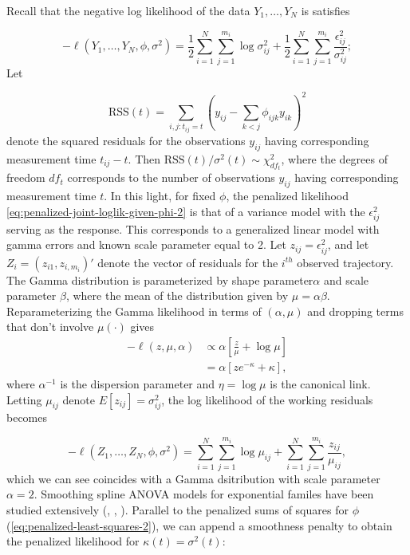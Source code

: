 

Recall that the negative log likelihood of the data $Y_1,\dots, Y_N$ is satisfies

\begin{equation} \label{eq:penalized-joint-loglik-given-phi-2}
-\ell\left( Y_1,\dots, Y_N, \phi, \sigma^2 \right) =  \frac{1}{2}\sum_{i = 1}^N \sum_{j = 1}^{m_i} \log \sigma^2_{ij}  + \frac{1}{2}\sum_{i = 1}^N \sum_{j = 1}^{m_i} \frac {\epsilon_{ij}^2}{\sigma^2_{ij}};
\end{equation}
\noindent
Let 

\begin{equation}
\mbox{RSS}\left( t \right) = \sum_{i,j:t_{ij}= t} \left( y_{ij} - \sum_{k<j} \phi_{ijk} y_{ik}\right)^2
\end{equation}
\noindent
denote the squared residuals for the observations $y_{ij}$ having corresponding measurement time $t_{ij} - t$. Then $\mbox{RSS}\left( t \right)/\sigma^2\left(t\right) \sim \chi^2_{df_t}$, where the degrees of freedom $df_{t}$ corresponds to the number of observations $y_{ij}$ having corresponding measurement time $t$. In this light, for fixed $\phi$, the penalized likelihood \ref{eq:penalized-joint-loglik-given-phi-2} is that of a variance model with the $\epsilon_{ij}^2$ serving as the response.  This corresponds to a generalized linear model with gamma errors and known scale parameter equal to 2. Let $z_{ij} = \epsilon_{ij}^2$, and let $Z_{i} = \left(z_{i1},z_{i,m_i} \right)'$ denote the vector of residuals for the $i^{th}$ observed trajectory. The Gamma distribution is parameterized by shape parameter$\alpha$ and scale parameter $\beta$, where the mean of the distribution given by $\mu = \alpha \beta$. Reparameterizing the Gamma likelihood in terms of $\left(\alpha, \mu \right)$ and dropping terms that don't involve $\mu\left(\cdot\right)$ gives  
\begin{align}
-\ell\left(z,\mu, \alpha \right) &\propto \alpha\left[\frac{z}{\mu} + \log \mu\right]  \label{eq:gamma-iv-likelihood} \\ 
&= \alpha\left[ze^{-\kappa} + \kappa\right],\label{eq:gamma-iv-likelihood-canonical-link}
\end{align}
\noindent
where $\alpha^{-1}$ is the dispersion parameter and $\eta = \log \mu$ is the canonical link. Letting $\mu_{ij}$ denote $E\left[ z_{ij} \right] = \sigma_{ij}^2$, the log likelihood of the working residuals becomes 

\begin{equation} \label{eq:penalized-joint-loglik-given-phi-3}
-\ell\left( Z_1,\dots, Z_N, \phi, \sigma^2 \right) =  \sum_{i = 1}^N \sum_{j = 1}^{m_i} \log \mu_{ij}  + \sum_{i = 1}^N \sum_{j = 1}^{m_i} \frac {z_{ij}}{\mu_{ij}},
\end{equation}
\noindent
which we can see coincides with a Gamma dsitribution with scale parameter $\alpha = 2$. Smoothing spline ANOVA models for exponential familes have been studied extensively (\citet{wahba1995smoothing}, \citet{wang1997grkpack}, \citet{gu2013smoothing}). Parallel to the penalized sums of squares for $\phi$ (\ref{eq:penalized-least-squares-2}), we can append a smoothness penalty to obtain the penalized likelihood for $\kappa\left(t\right) = \sigma^2\left(t\right)$:

